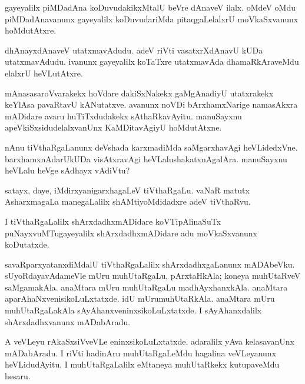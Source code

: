 \documentclass{article}
\begin{document}
\begin{mn}
gayeyalilx piMDadAna koDuvudakikxMtalU beVre dAnaveV ilalx. oMdeV oMdu
piMDadAnavanunx gayeyalilx koDuvudariMda pitaqgaLelalxrU moVkaSxvanunx hoMdutAtxre.
\end{mn}

\begin{mn}
dhAnayxdAnaveV utatxmavAdudu. adeV riVti vasatxrXdAnavU kUDa
utatxmavAdudu. ivanunx gayeyalilx koTaTxre utatxmavAda dhamaRkAraveMdu
elalxrU heVLutAtxre.
\end{mn}

\begin{mn}%
mAnasasaroVvarakekx hoVdare dakiSxNakekx gaMgAnadiyU utatxrakekx
keYlAsa pavaRtavU kANutatxve. avanunx noVDi bArxhamxNarige namasAkxra
mADidare avaru huTiTxdudakekx sAthaRkavAyitu. manuSayxnu
apeVkiSxsidudelalxvanUnx KaMDitavAgiyU hoMdutAtxne.
\end{mn}

\begin{mn}
nAnu tiVthaRgaLanunx deVshada karxmadiMda saMgarxhavAgi
heVLidedxVne. barxhamxnAdarUkUDa visAtxravAgi
heVLalushakatxnAgalAra. manuSayxnu heVLalu heVge sAdhayx vAdiVtu?
\end{mn}

\begin{mn}
satayx, daye, iMdirxyanigarxhagaLeV tiVthaRgaLu. vaNaR matutx
AsharxmagaLa manegaLalilx shAMtiyoMdidadxre adeV tiVthaRvu.
\end{mn}

\begin{mn}
I tiVthaRgaLalilx shArxdadhxmADidare koVTipAlinaSuTx
puNayxvuMTugayeyalilx shArxdadhxmADidare adu moVkaSxvanunx koDutatxde.
\end{mn}

\begin{mn}%
 savaRparxyatanxdiMdalU tiVthaRgaLalilx shArxdadhxgaLanunx
 mADAbeVku. sUyoRdayavAdameVle mUru muhUtaRgaLu, pArxtaHkAla; koneya
 muhUtaRveV saMgamakAla. anaMtara mUru muhUtaRgaLu
 madhAyxhanxkAla. anaMtara aparAhaNxvenisikoLuLxtatxde. idU
 mUrumuhUtaRkAla. anaMtara mUru muhUtaRgaLakAla
 sAyAhanxveninxsikoLuLxtatxde. I sAyAhanxdalilx shArxdadhxvanunx mADabAradu.
\end{mn}

\begin{mn}
A veVLeyu rAkaSxsiVveVLe eninxsikoLuLxtatxde. adaralilx yAva
kelasavanUnx mADabAradu. I riVti hadinAru muhUtaRgaLeMdu hagalina
veVLeyanunx heVLidudAyitu. I muhUtaRgaLalilx eMtaneya muhUtaRkekx
kutupaveMdu hesaru.
\end{mn}
\end{document}
